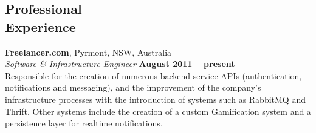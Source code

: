 \documentclass[margin,line]{resume}
\begin{document}
\begin{resume}







    \section{\mysidestyle Professional\\Experience}
    \textbf{Freelancer.com}, Pyrmont, NSW, Australia \vspace{2mm}\\\vspace{1mm}%
    \textsl{Software \& Infrastructure Engineer} \hfill \textbf{August 2011 -- present}\\
    Responsible for the creation of numerous backend service APIs (authentication, notifications and messaging),
    and the improvement of the company's infrastructure processes with the introduction of systems such as
    RabbitMQ and Thrift. Other systems include the creation of a custom Gamification system and a persistence
    layer for realtime notifications.
   

\end{resume}
\end{document}
